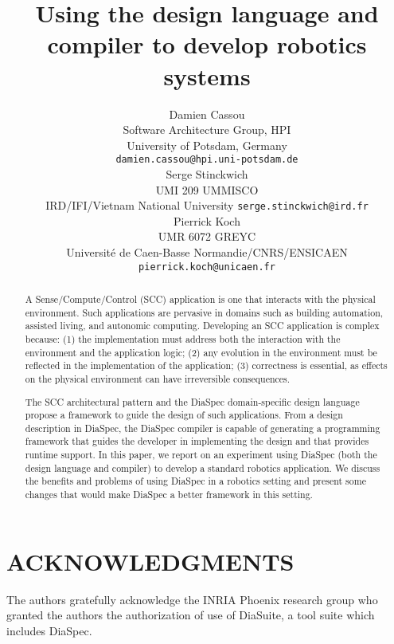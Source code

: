 \documentclass[letterpaper, 10 pt, conference]{ieeeconf}  %
\title{Using the \diaspec{} design language and compiler to develop
  robotics systems}
\author{%
  \parbox{2.4 in}{\centering Damien Cassou\\
    Software Architecture Group, HPI\\
    University of Potsdam, Germany\\%
    {\tt\small damien.cassou@hpi.uni-potsdam.de}}
  \hspace*{ 0.1 in}
  \parbox{2.35 in}{ \centering Serge Stinckwich\\
UMI 209 UMMISCO\\IRD/IFI/Vietnam National University
    {\tt\small serge.stinckwich@ird.fr}}
  \hspace*{ 0.1 in}
  \parbox{1.9 in}{ \centering Pierrick Koch\\
UMR 6072 GREYC\\Université de Caen-Basse Normandie/CNRS/ENSICAEN\\
    {\tt\small pierrick.koch@unicaen.fr}}
}
\newcommand{\diaspec}{Dia\-Spec\xspace}
\begin{document}
\maketitle
\thispagestyle{empty}
\pagestyle{empty}


\begin{abstract}

  A Sense/Compute/Control (SCC) application is one that interacts with
  the physical environment. Such applications are pervasive in domains
  such as building automation, assisted living, and autonomic
  computing. Developing an SCC application is complex because: (1) the
  implementation must address both the interaction with the
  environment and the application logic; (2) any evolution in the
  environment must be reflected in the implementation of the
  application; (3) correctness is essential, as effects on the
  physical environment can have irreversible consequences.

  The SCC architectural pattern and the \diaspec{} domain-specific
  design language propose a framework to guide the design of such
  applications. From a design description in \diaspec{}, the
  \diaspec{} compiler is capable of generating a programming framework
  that guides the developer in implementing the design and that
  provides runtime support. In this paper, we report on an experiment
  using \diaspec{} (both the design language and compiler) to develop
  a standard robotics application. We discuss the benefits and
  problems of using \diaspec{} in a robotics setting and present some
  changes that would make \diaspec{} a better framework in this
  setting.

\end{abstract}








\section{ACKNOWLEDGMENTS}

The authors gratefully acknowledge the INRIA Phoenix research group
who granted the authors the authorization of use of DiaSuite, a tool
suite which includes \diaspec{}.



\end{document}
